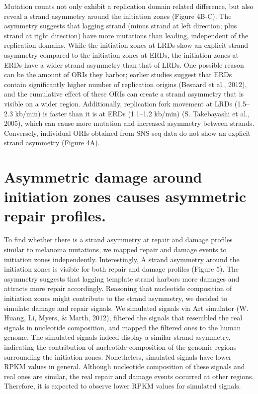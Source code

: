 Mutation counts not only exhibit a replication domain related difference, but also reveal a strand asymmetry around the initiation zones (Figure 4B-C). The asymmetry suggests that lagging strand (minus strand at left direction; plus strand at right direction) have more mutations than leading, independent of the replication domains. While the initiation zones at LRDs show an explicit strand asymmetry compared to the initiation zones at ERDs, the initiation zones at ERDs have a wider strand asymmetry than that of LRDs. One possible reason can be the amount of ORIs they harbor; earlier studies suggest that ERDs contain significantly higher number of replication origins (Besnard et al., 2012), and the cumulative effect of these ORIs can create a strand asymmetry that is visible on a wider region. Additionally, replication fork movement at LRDs (1.5–2.3 kb/min) is faster than it is at ERDs (1.1–1.2 kb/min) (S. Takebayashi et al., 2005), which can cause more mutation and increased asymmetry between strands. Conversely, individual ORIs obtained from SNS-seq data do not show an explicit strand asymmetry (Figure 4A).

\section{Asymmetric damage around initiation zones causes asymmetric repair profiles.}

To find whether there is a strand asymmetry at repair and damage profiles similar to melanoma mutations, we mapped repair and damage events to initiation zones independently. Interestingly, A strand asymmetry around the initiation zones is visible for both repair and damage profiles (Figure 5). The asymmetry suggests that lagging template strand harbors more damages and attracts more repair accordingly. Reasoning that nucleotide composition of initiation zones might contribute to the strand asymmetry, we decided to simulate damage and repair signals. We simulated signals via Art simulator (W. Huang, Li, Myers, \& Marth, 2012), filtered the signals that resembled the real signals in nucleotide composition, and mapped the filtered ones to the human genome. The simulated signals indeed display a similar strand asymmetry, indicating the contribution of nucleotide composition of the genomic regions surrounding the initiation zones. Nonetheless, simulated signals have lower RPKM values in general. Although nucleotide composition of these signals and real ones are similar, the real repair and damage events occurred at other regions. Therefore, it is expected to observe lower RPKM values for simulated signals. 

